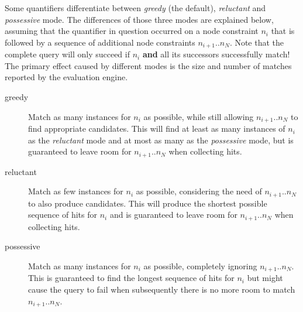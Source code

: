 \documentclass[11pt,a4paper]{report}
\begin{document}
Some quantifiers differentiate between \textit{greedy} (the default), \textit{reluctant} and \textit{possessive} mode.
The differences of those three modes are explained below, assuming that the quantifier in question occurred on a node constraint $n_i$ that is followed by a sequence of additional node constraints $n_{i+1}..n_N$.
Note that the complete query will only succeed if $n_i$ \textbf{and} all its successors successfully match!
The primary effect caused by different modes is the size and number of matches reported by the evaluation engine.
\begin{description}
	\item[greedy] Match as many instances for $n_i$ as possible, while still allowing $n_{i+1}..n_N$ to find appropriate candidates. This will find at least as many instances of $n_i$ as the \textit{reluctant} mode and at most as many as the \textit{possessive} mode, but is guaranteed to leave room for $n_{i+1}..n_N$ when collecting hits.
	\item[reluctant] Match as few instances for $n_i$ as possible, considering the need of $n_{i+1}..n_N$ to also produce candidates. This will produce the shortest possible sequence of hits for $n_i$ and is guaranteed to leave room for $n_{i+1}..n_N$ when collecting hits.
	\item[possessive] Match as many instances for $n_i$ as possible, completely ignoring $n_{i+1}..n_N$. This is guaranteed to find the longest sequence of hits for $n_i$ but might cause the query to fail when subsequently there is no more room to match $n_{i+1}..n_N$.
\end{description}
\end{document}
